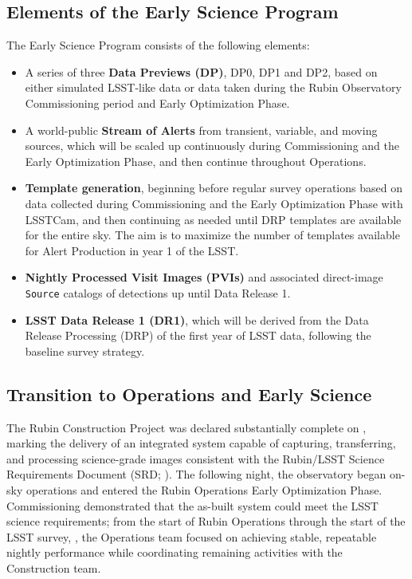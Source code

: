 \subsection{Elements of the Early Science Program}
 \label{ssec:elements}
The Early Science Program consists of the following elements:
\begin{itemize}
	\item A series of three \textbf{Data Previews (DP)}, DP0, DP1 and DP2,  based on either simulated LSST-like data or data taken during the Rubin Observatory Commissioning period and Early Optimization Phase. 
	\item A world-public \textbf{Stream of Alerts} from transient, variable, and moving sources, which will be scaled up continuously during Commissioning and the Early Optimization Phase, and then continue throughout Operations.
	\item  \textbf{Template generation}, beginning before regular survey operations based on data collected during  Commissioning and the Early Optimization Phase  with LSSTCam,  and then continuing as needed until DRP templates are available for the entire sky.
The aim is to maximize the number of templates available for Alert Production in year 1 of the LSST.
	\item \textbf{Nightly Processed Visit Images (PVIs)} and associated direct-image \texttt{Source} catalogs of detections up until  Data Release 1. 
	\item \textbf{LSST Data Release 1 (DR1)}, which will be derived from the Data Release Processing (DRP) of the first year of LSST data,  following the baseline survey strategy.
\end{itemize}

%
\subsection{Transition to Operations and Early Science}
\label{ssec:transition}
The Rubin Construction Project was declared substantially complete on \cstrcompdate, marking the delivery of an integrated system capable of capturing, transferring, and processing science-grade images consistent with the Rubin/LSST Science Requirements Document (SRD; \citealt[][]{LPM-17}).
The following night, the observatory began on-sky operations and entered the Rubin Operations Early Optimization Phase.
Commissioning demonstrated that the as-built system could meet the LSST science requirements; from the start of Rubin Operations through the start of the LSST survey, \lsststartdate, the Operations team focused on achieving stable, repeatable nightly performance while coordinating remaining activities with the Construction team.

